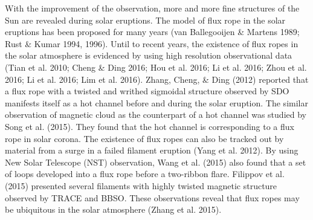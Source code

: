 \documentclass[12pt,preprint]{aastex}
\begin{document}
\begin{CJK*}{UTF8}{gbsn}
With the improvement of the observation, more and more fine structures of the Sun are revealed during solar eruptions. The model of flux rope in the solar eruptions has been proposed for many years (van Ballegooijen \& Martens 1989; Rust \& Kumar 1994, 1996). Until to recent years, the existence of flux ropes in the solar atmosphere is evidenced by using high resolution observational data (Tian et al. 2010; Cheng \& Ding 2016; Hou et al. 2016; Li et al. 2016; Zhou et al. 2016; Li et al. 2016; Lim et al. 2016). Zhang, Cheng, \& Ding (2012) reported that a flux rope with a twisted and writhed sigmoidal structure observed by SDO manifests itself as a hot channel before and during the solar eruption. The similar observation of magnetic cloud as the counterpart of a hot channel was studied by Song et al. (2015). They found that the hot channel is corresponding to a flux rope in solar corona. The existence of flux ropes can also be tracked out by material from a surge in a failed filament eruption (Yang et al. 2012). By using New Solar Telescope (NST) observation, Wang et al. (2015)  also found that a set of loops developed into a flux rope before a two-ribbon flare. Filippov et al. (2015) presented several filaments with highly twisted magnetic structure observed by TRACE and BBSO. These observations reveal that flux ropes may be ubiquitous in the solar atmosphere (Zhang et al. 2015).


\end{CJK*}
\end{document}

